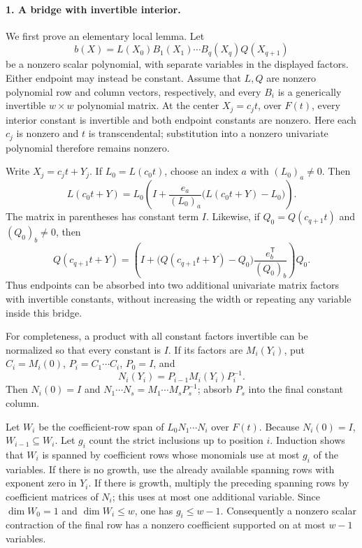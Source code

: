 \paragraph{1. A bridge with invertible interior.}
We first prove an elementary local lemma. Let
\[
 b(X)=L(X_0)B_1(X_1)\cdots B_q(X_q)Q(X_{q+1})
 \tag{P14.6}
\]
be a nonzero scalar polynomial, with separate variables in the
displayed factors. Either endpoint may instead be constant.
Assume that $L,Q$ are nonzero polynomial row and column vectors,
respectively, and every $B_i$ is a generically invertible
$w\times w$ polynomial matrix. At the center $X_j=c_jt$, over
$F(t)$, every interior constant is invertible and both endpoint
constants are nonzero. Here each $c_j$ is nonzero and $t$ is
transcendental; substitution into a nonzero univariate polynomial
therefore remains nonzero.

Write $X_j=c_jt+Y_j$. If $L_0=L(c_0t)$, choose an index $a$ with
$(L_0)_a\ne0$. Then
\[
 L(c_0t+Y)=L_0\left(I+
       \frac{e_a}{(L_0)_a}\bigl(L(c_0t+Y)-L_0\bigr)\right).
 \tag{P14.7}
\]
The matrix in parentheses has constant term $I$. Likewise, if
$Q_0=Q(c_{q+1}t)$ and $(Q_0)_b\ne0$, then
\[
 Q(c_{q+1}t+Y)=\left(I+
       \bigl(Q(c_{q+1}t+Y)-Q_0\bigr)
                      \frac{e_b^{\mathsf T}}{(Q_0)_b}\right)Q_0.
 \tag{P14.8}
\]
Thus endpoints can be absorbed into two additional univariate
matrix factors with invertible constants, without increasing
the width or repeating any variable inside this bridge.

For completeness, a product with all constant factors invertible
can be normalized so that every constant is $I$. If its factors
are $M_i(Y_i)$, put $C_i=M_i(0)$, $P_i=C_1\cdots C_i$, $P_0=I$,
and
\[
 N_i(Y_i)=P_{i-1}M_i(Y_i)P_i^{-1}.
\]
Then $N_i(0)=I$ and
$N_1\cdots N_s=M_1\cdots M_sP_s^{-1}$; absorb $P_s$ into
the final constant column.

Let $W_i$ be the coefficient-row span of
$L_0N_1\cdots N_i$ over $F(t)$. Because $N_i(0)=I$,
$W_{i-1}\subseteq W_i$. Let $g_i$ count the strict inclusions
up to position $i$. Induction shows that $W_i$ is spanned by
coefficient rows whose monomials use at most $g_i$ of the
variables. If there is no growth, use the already available
spanning rows with exponent zero in $Y_i$. If there is growth,
multiply the preceding spanning rows by coefficient matrices
of $N_i$; this uses at most one additional variable. Since
$\dim W_0=1$ and $\dim W_i\leq w$, one has $g_i\leq w-1$.
Consequently a nonzero scalar contraction of the final row
has a nonzero coefficient supported on at most $w-1$ variables.

